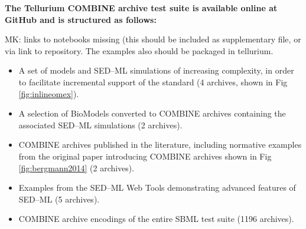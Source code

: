 \documentclass[10pt,letterpaper]{article}
\begin{document}
\textbf{The Tellurium COMBINE archive test suite is available online at GitHub \cite{catests} and is structured as follows:}


{\color{orange} MK: links to notebooks missing (this should be included as supplementary file, or via link to repository. The examples also should be packaged in tellurium.}

\begin{itemize}
\item A set of models and SED--ML simulations of increasing complexity, in order to facilitate incremental support of the standard (4 archives, shown in Fig \ref{fig:inlineomex}).
\item A selection of BioModels converted to COMBINE archives containing the associated SED--ML simulations (2 archives).
\item COMBINE archives published in the literature, including normative examples from the original paper introducing COMBINE archives \cite{bergmann2014combine} shown in Fig \ref{fig:bergmann2014} (2 archives).
\item Examples from the SED--ML Web Tools \cite{bergmann2017sed} demonstrating advanced features of SED--ML (5 archives).
\item COMBINE archive encodings of the entire SBML test suite (1196 archives).
\end{itemize}
\end{document}
